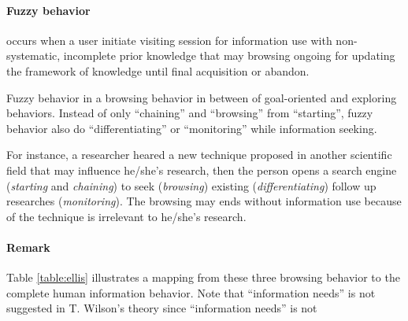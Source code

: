 \paragraph{Fuzzy behavior} occurs when a user initiate visiting session for information use
 with non-systematic, incomplete prior knowledge that may browsing ongoing for updating 
the framework of knowledge until final acquisition or abandon.

Fuzzy behavior in a browsing behavior in between of goal-oriented and exploring behaviors.
Instead of only ``chaining'' and ``browsing'' from ``starting'', fuzzy behavior also do
``differentiating'' or ``monitoring'' while information seeking.

For instance, a researcher heared a new technique proposed in another scientific field 
that may influence he/she's research, then the person 
opens a search engine (\emph{starting} and \emph{chaining}) to seek (\emph{browsing}) existing (\emph{differentiating}) 
follow up researches (\emph{monitoring}). The browsing may ends without information use
because of the technique is irrelevant to he/she's research.

\paragraph{Remark} Table \ref{table:ellis} illustrates a mapping from these three
browsing behavior to the complete human information behavior.
Note that ``information needs'' is not suggested in T. Wilson's theory since
``information needs'' is not 

